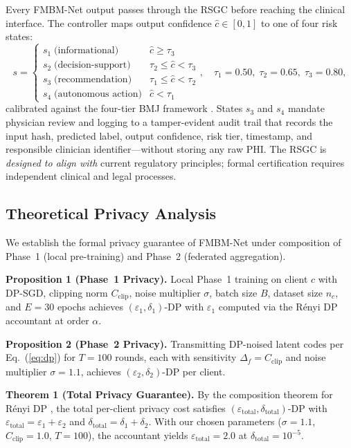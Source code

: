 \documentclass[a4paper,fleqn]{cas-dc}
\begin{document}
Every FMBM-Net output passes through the RSGC before reaching the clinical
interface. The controller maps output confidence $\hat{c}\!\in\![0,1]$ to one
of four risk states:
\begin{equation}
s =
\begin{cases}
s_1\;\text{(informational)}     & \hat{c}\geq\tau_3\\
s_2\;\text{(decision-support)}  & \tau_2\leq\hat{c}<\tau_3\\
s_3\;\text{(recommendation)}    & \tau_1\leq\hat{c}<\tau_2\\
s_4\;\text{(autonomous action)} & \hat{c}<\tau_1
\end{cases},\quad
\tau_1\!=\!0.50,\;\tau_2\!=\!0.65,\;\tau_3\!=\!0.80,
\label{eq:rsgc}
\end{equation}
calibrated against the four-tier BMJ framework \citep{bmj_governance_2026}.
States $s_3$ and $s_4$ mandate physician review and logging to a
tamper-evident audit trail that records the input hash, predicted label, output
confidence, risk tier, timestamp, and responsible clinician identifier---without
storing any raw PHI. The RSGC is \emph{designed to align with} current
regulatory principles; formal certification requires independent clinical and
legal processes.

\subsection{Theoretical Privacy Analysis}
\label{subsec:privacy_theory}

We establish the formal privacy guarantee of FMBM-Net under composition of
Phase~1 (local pre-training) and Phase~2 (federated aggregation).

\textbf{Proposition 1 (Phase~1 Privacy).}
Local Phase~1 training on client $c$ with DP-SGD, clipping norm $C_{\mathrm{clip}}$,
noise multiplier $\sigma$, batch size $B$, dataset size $n_c$, and
$E\!=\!30$ epochs achieves $(\varepsilon_1, \delta_1)$-DP with
$\varepsilon_1$ computed via the R\'{e}nyi DP accountant
\citep{mironov2017renyi} at order $\alpha$.

\textbf{Proposition 2 (Phase~2 Privacy).}
Transmitting DP-noised latent codes per Eq.~(\ref{eq:dp}) for $T\!=\!100$
rounds, each with sensitivity $\Delta_f\!=\!C_{\mathrm{clip}}$ and noise
multiplier $\sigma\!=\!1.1$, achieves $(\varepsilon_2,\delta_2)$-DP
per client.

\textbf{Theorem 1 (Total Privacy Guarantee).}
By the composition theorem for R\'{e}nyi DP \citep{mironov2017renyi},
the total per-client privacy cost satisfies
$(\varepsilon_{\mathrm{total}}, \delta_{\mathrm{total}})$-DP with
$\varepsilon_{\mathrm{total}}\!=\!\varepsilon_1 + \varepsilon_2$ and
$\delta_{\mathrm{total}}\!=\!\delta_1 + \delta_2$. With our chosen parameters
($\sigma\!=\!1.1$, $C_{\mathrm{clip}}\!=\!1.0$, $T\!=\!100$), the accountant
yields $\varepsilon_{\mathrm{total}}\!=\!2.0$ at $\delta_{\mathrm{total}}\!=\!10^{-5}$.
\end{document}
